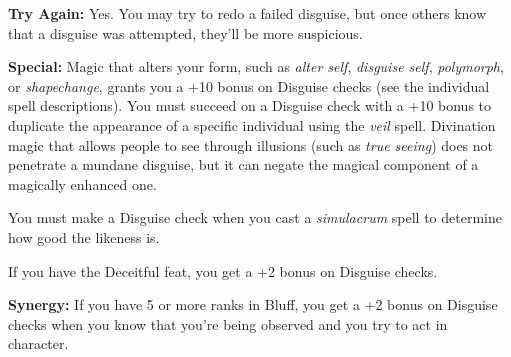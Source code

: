 \textbf{Try Again:} Yes. You may try to redo a failed disguise, but once others know that a disguise was attempted, they’ll be more suspicious.

\textbf{Special:} Magic that alters your form, such as \emph{alter self}, \emph{disguise self}, \emph{polymorph}, or \emph{shapechange}, grants you a +10 bonus on Disguise checks (see the individual spell descriptions). You must succeed on a Disguise check with a +10 bonus to duplicate the appearance of a specific individual using the \emph{veil} spell. Divination magic that allows people to see through illusions (such as \emph{true seeing}) does not penetrate a mundane disguise, but it can negate the magical component of a magically enhanced one.

You must make a Disguise check when you cast a \emph{simulacrum} spell to determine how good the likeness is.

If you have the Deceitful feat, you get a +2 bonus on Disguise checks.

\textbf{Synergy:} If you have 5 or more ranks in Bluff, you get a +2 bonus on Disguise checks when you know that you’re being observed and you try to act in character.